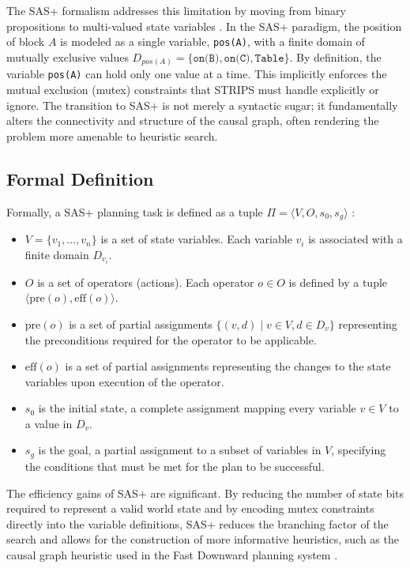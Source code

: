 \documentclass[12pt,a4paper]{report}
\begin{document}
The SAS+ formalism addresses this limitation by moving from binary propositions to multi-valued state variables \cite{backstrom93}. In the SAS+ paradigm, the position of block $A$ is modeled as a single variable, \texttt{pos(A)}, with a finite domain of mutually exclusive values $D_{pos(A)} = \{\texttt{on(B)}, \texttt{on(C)}, \texttt{Table}\}$. By definition, the variable \texttt{pos(A)} can hold only one value at a time. This implicitly enforces the mutual exclusion (mutex) constraints that STRIPS must handle explicitly or ignore. The transition to SAS+ is not merely a syntactic sugar; it fundamentally alters the connectivity and structure of the causal graph, often rendering the problem more amenable to heuristic search.

\subsection*{Formal Definition}
Formally, a SAS+ planning task is defined as a tuple $\Pi = \langle V, O, s_0, s_g \rangle$ \cite{saarland, fastdownward}:
\begin{itemize}
    \item $V = \{v_1, \dots, v_n\}$ is a set of state variables. Each variable $v_i$ is associated with a finite domain $D_{v_i}$.
    \item $O$ is a set of operators (actions). Each operator $o \in O$ is defined by a tuple $\langle \text{pre}(o), \text{eff}(o) \rangle$.
    \item $\text{pre}(o)$ is a set of partial assignments $\{(v, d) \mid v \in V, d \in D_v\}$ representing the preconditions required for the operator to be applicable.
    \item $\text{eff}(o)$ is a set of partial assignments representing the changes to the state variables upon execution of the operator.
    \item $s_0$ is the initial state, a complete assignment mapping every variable $v \in V$ to a value in $D_v$.
    \item $s_g$ is the goal, a partial assignment to a subset of variables in $V$, specifying the conditions that must be met for the plan to be successful.
\end{itemize}

The efficiency gains of SAS+ are significant. By reducing the number of state bits required to represent a valid world state and by encoding mutex constraints directly into the variable definitions, SAS+ reduces the branching factor of the search and allows for the construction of more informative heuristics, such as the causal graph heuristic used in the Fast Downward planning system \cite{fastdownward}.
\end{document}
